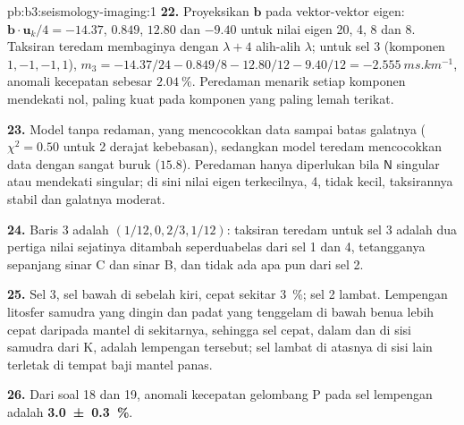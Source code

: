 \begin{solution}{pb:b3:seismology-imaging:1}
\textbf{22.} Proyeksikan $\mathbf b$ pada vektor-vektor eigen: $\mathbf b\cdot\mathbf u_k/4
= -14.37$, $0.849$, $12.80$ dan $-9.40$ untuk nilai eigen 20, 4, 8 dan 8.
Taksiran teredam membaginya dengan $\lambda + 4$ alih-alih $\lambda$; untuk
sel 3 (komponen $1, -1, -1, 1$),
$m_3 = -14.37/24 - 0.849/8 - 12.80/12 - 9.40/12 = \qty{-2.555}{ms.km^{-1}}$,
anomali kecepatan sebesar $\qty{+2.04}{\percent}$. Peredaman menarik setiap
komponen mendekati nol, paling kuat pada komponen yang paling lemah terikat.

\textbf{23.} Model tanpa redaman, yang mencocokkan data sampai batas galatnya
($\chi^2 = 0.50$ untuk 2 derajat kebebasan), sedangkan model teredam
mencocokkan data dengan sangat buruk ($15.8$). Peredaman hanya diperlukan bila
$\mathsf N$ singular atau mendekati singular; di sini nilai eigen terkecilnya, 4,
tidak kecil, taksirannya stabil dan galatnya moderat.

\textbf{24.} Baris 3 adalah $(1/12, 0, 2/3, 1/12)$: taksiran teredam untuk sel 3
adalah dua pertiga nilai sejatinya ditambah seperduabelas dari sel 1 dan 4,
tetangganya sepanjang sinar C dan sinar B, dan tidak ada apa pun dari sel 2.

\textbf{25.} Sel 3, sel bawah di sebelah kiri, cepat sekitar
\qty{3}{\percent}; sel 2 lambat. Lempengan litosfer samudra yang dingin dan padat
yang tenggelam di bawah benua lebih cepat daripada mantel di sekitarnya, sehingga
sel cepat, dalam dan di sisi samudra dari K, adalah lempengan tersebut; sel lambat
di atasnya di sisi lain terletak di tempat baji mantel panas.

\textbf{26.} Dari soal 18 dan 19, anomali kecepatan gelombang P pada sel lempengan adalah
\textbf{\qty[text-series-to-math=true, uncertainty-mode=separate]{3.0 \pm 0.3}{\percent}}.
\end{solution}
